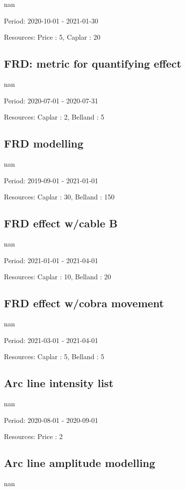 nan

Period: 2020-10-01 - 2021-01-30

Resources: Price : 5, Caplar : 20

\subsection{FRD: metric for quantifying effect}

nan

Period: 2020-07-01 - 2020-07-31

Resources: Caplar : 2, Belland : 5

\subsection{FRD modelling}

nan

Period: 2019-09-01 - 2021-01-01

Resources: Caplar : 30, Belland : 150

\subsection{FRD effect w/cable B}

nan

Period: 2021-01-01 - 2021-04-01

Resources: Caplar : 10, Belland : 20

\subsection{FRD effect w/cobra movement}

nan

Period: 2021-03-01 - 2021-04-01

Resources: Caplar : 5, Belland : 5

\subsection{Arc line intensity list}

nan

Period: 2020-08-01 - 2020-09-01

Resources: Price : 2

\subsection{Arc line amplitude modelling}

nan

